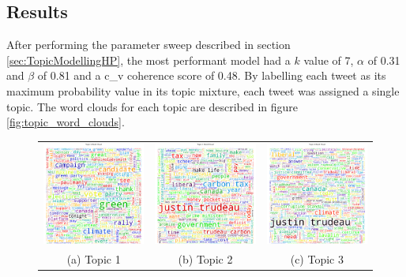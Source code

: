\subsection{Results}\label{sec:TopicModellingRes}

After performing the parameter sweep described in section
\ref{sec:TopicModellingHP}, the most performant model had a $k$ value of 7,
$\alpha$ of 0.31 and $\beta$ of 0.81 and a c\_v coherence score of 0.48. By
labelling each tweet as its maximum probability value in its topic mixture, each
tweet was assigned a single topic. The word clouds for each topic are described
in figure \ref{fig:topic_word_clouds}. 

\begin{singlespacing}
    \begin{figure}
        \centering
        \begin{tabular}{ccc}
        \includegraphics[width=45mm]{Figures/topic_1_wordcloud} &
        \includegraphics[width=45mm]{Figures/topic_2_wordcloud} &
        \includegraphics[width=45mm]{Figures/topic_3_wordcloud} \\
        (a) Topic 1 & (b) Topic 2 & (c) Topic 3  \\[6pt]

\end{tabular}
\end{figure}
\end{singlespacing}

